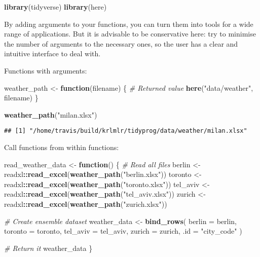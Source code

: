 \documentclass[]{book}
\newenvironment{Shaded}{\begin{snugshade}}{\end{snugshade}}
\newcommand{\CommentTok}[1]{\textcolor[rgb]{0.56,0.35,0.01}{\textit{#1}}}
\newcommand{\ControlFlowTok}[1]{\textcolor[rgb]{0.13,0.29,0.53}{\textbf{#1}}}
\newcommand{\DataTypeTok}[1]{\textcolor[rgb]{0.13,0.29,0.53}{#1}}
\newcommand{\KeywordTok}[1]{\textcolor[rgb]{0.13,0.29,0.53}{\textbf{#1}}}
\newcommand{\NormalTok}[1]{#1}
\newcommand{\OperatorTok}[1]{\textcolor[rgb]{0.81,0.36,0.00}{\textbf{#1}}}
\newcommand{\StringTok}[1]{\textcolor[rgb]{0.31,0.60,0.02}{#1}}
\begin{document}
\begin{Shaded}
\begin{Highlighting}[]
\KeywordTok{library}\NormalTok{(tidyverse)}
\KeywordTok{library}\NormalTok{(here)}
\end{Highlighting}
\end{Shaded}

By adding arguments to your functions, you can turn them into tools for a wide range of applications.
But it is advisable to be conservative here: try to minimise the number of arguments to the necessary ones, so the user has a clear and intuitive interface to deal with.

Functions with arguments:

\begin{Shaded}
\begin{Highlighting}[]
\NormalTok{weather_path <-}\StringTok{ }\ControlFlowTok{function}\NormalTok{(filename) \{}
  \CommentTok{# Returned value}
  \KeywordTok{here}\NormalTok{(}\StringTok{"data/weather"}\NormalTok{, filename)}
\NormalTok{\}}

\KeywordTok{weather_path}\NormalTok{(}\StringTok{"milan.xlsx"}\NormalTok{)}
\end{Highlighting}
\end{Shaded}

\begin{verbatim}
## [1] "/home/travis/build/krlmlr/tidyprog/data/weather/milan.xlsx"
\end{verbatim}

Call functions from within functions:

\begin{Shaded}
\begin{Highlighting}[]
\NormalTok{read_weather_data <-}\StringTok{ }\ControlFlowTok{function}\NormalTok{() \{}
  \CommentTok{# Read all files}
\NormalTok{  berlin <-}\StringTok{ }\NormalTok{readxl}\OperatorTok{::}\KeywordTok{read_excel}\NormalTok{(}\KeywordTok{weather_path}\NormalTok{(}\StringTok{"berlin.xlsx"}\NormalTok{))}
\NormalTok{  toronto <-}\StringTok{ }\NormalTok{readxl}\OperatorTok{::}\KeywordTok{read_excel}\NormalTok{(}\KeywordTok{weather_path}\NormalTok{(}\StringTok{"toronto.xlsx"}\NormalTok{))}
\NormalTok{  tel_aviv <-}\StringTok{ }\NormalTok{readxl}\OperatorTok{::}\KeywordTok{read_excel}\NormalTok{(}\KeywordTok{weather_path}\NormalTok{(}\StringTok{"tel_aviv.xlsx"}\NormalTok{))}
\NormalTok{  zurich <-}\StringTok{ }\NormalTok{readxl}\OperatorTok{::}\KeywordTok{read_excel}\NormalTok{(}\KeywordTok{weather_path}\NormalTok{(}\StringTok{"zurich.xlsx"}\NormalTok{))}

  \CommentTok{# Create ensemble dataset}
\NormalTok{  weather_data <-}\StringTok{ }\KeywordTok{bind_rows}\NormalTok{(}
    \DataTypeTok{berlin =}\NormalTok{ berlin,}
    \DataTypeTok{toronto =}\NormalTok{ toronto,}
    \DataTypeTok{tel_aviv =}\NormalTok{ tel_aviv,}
    \DataTypeTok{zurich =}\NormalTok{ zurich,}
    \DataTypeTok{.id =} \StringTok{"city_code"}
\NormalTok{  )}

  \CommentTok{# Return it}
\NormalTok{  weather_data}
\NormalTok{\}}
\end{Highlighting}
\end{Shaded}
\end{document}
